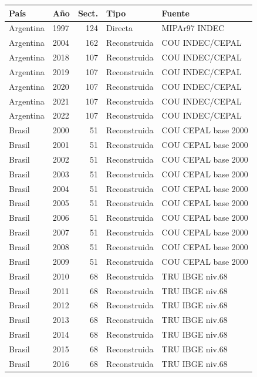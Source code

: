 \documentclass[11pt,a4paper]{article}
\begin{document}
\begin{center}
\small
\begin{longtable}{llrll}
\toprule
\textbf{País} & \textbf{Año} & \textbf{Sect.} & \textbf{Tipo} & \textbf{Fuente} \\
\midrule
\endhead
Argentina & 1997 & 124 & Directa & MIPAr97 INDEC \\
Argentina & 2004 & 162 & Reconstruida & COU INDEC/CEPAL \\
Argentina & 2018 & 107 & Reconstruida & COU INDEC/CEPAL \\
Argentina & 2019 & 107 & Reconstruida & COU INDEC/CEPAL \\
Argentina & 2020 & 107 & Reconstruida & COU INDEC/CEPAL \\
Argentina & 2021 & 107 & Reconstruida & COU INDEC/CEPAL \\
Argentina & 2022 & 107 & Reconstruida & COU INDEC/CEPAL \\
Brasil & 2000 & 51 & Reconstruida & COU CEPAL base 2000 \\
Brasil & 2001 & 51 & Reconstruida & COU CEPAL base 2000 \\
Brasil & 2002 & 51 & Reconstruida & COU CEPAL base 2000 \\
Brasil & 2003 & 51 & Reconstruida & COU CEPAL base 2000 \\
Brasil & 2004 & 51 & Reconstruida & COU CEPAL base 2000 \\
Brasil & 2005 & 51 & Reconstruida & COU CEPAL base 2000 \\
Brasil & 2006 & 51 & Reconstruida & COU CEPAL base 2000 \\
Brasil & 2007 & 51 & Reconstruida & COU CEPAL base 2000 \\
Brasil & 2008 & 51 & Reconstruida & COU CEPAL base 2000 \\
Brasil & 2009 & 51 & Reconstruida & COU CEPAL base 2000 \\
Brasil & 2010 & 68 & Reconstruida & TRU IBGE niv.68 \\
Brasil & 2011 & 68 & Reconstruida & TRU IBGE niv.68 \\
Brasil & 2012 & 68 & Reconstruida & TRU IBGE niv.68 \\
Brasil & 2013 & 68 & Reconstruida & TRU IBGE niv.68 \\
Brasil & 2014 & 68 & Reconstruida & TRU IBGE niv.68 \\
Brasil & 2015 & 68 & Reconstruida & TRU IBGE niv.68 \\
Brasil & 2016 & 68 & Reconstruida & TRU IBGE niv.68 \\

\end{longtable}
\end{center}
\end{document}
